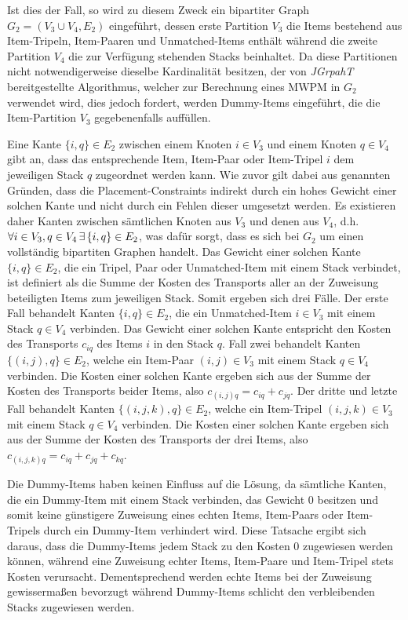 Ist dies der Fall, so wird zu diesem Zweck ein bipartiter Graph $G_2 = (V_3 \cup V_4, E_2)$ eingeführt,
dessen erste Partition $V_3$ die Items bestehend aus Item-Tripeln, Item-Paaren und Unmatched-Items enthält während die zweite Partition $V_4$
die zur Verfügung stehenden Stacks beinhaltet. Da diese Partitionen nicht notwendigerweise dieselbe Kardinalität besitzen, der von \textit{JGrpahT} bereitgestellte Algorithmus, welcher zur Berechnung eines \textsc{MWPM} in $G_2$ verwendet wird, dies jedoch fordert, werden Dummy-Items
eingeführt, die die Item-Partition $V_3$ gegebenenfalls auffüllen.


Eine Kante $\{i, q\} \in E_2$ zwischen einem Knoten $i \in V_3$ und einem Knoten $q \in V_4$ gibt an, dass das entsprechende Item, Item-Paar oder Item-Tripel $i$ dem jeweiligen Stack $q$ zugeordnet werden kann. Wie zuvor gilt dabei
aus genannten Gründen, dass die Placement-Constraints indirekt durch ein hohes Gewicht einer solchen Kante und nicht durch ein Fehlen dieser
umgesetzt werden. Es existieren daher Kanten zwischen sämtlichen Knoten aus $V_3$ und denen aus $V_4$, d.h. $\forall i \in V_3, q \in V_4
\thinspace \exists \thinspace \{i, q\} \in E_2$, was dafür sorgt, dass es sich bei $G_2$ um einen vollständig bipartiten Graphen handelt.
Das Gewicht einer solchen Kante $\{i, q\} \in E_2$, die ein Tripel, Paar oder Unmatched-Item mit einem Stack verbindet, ist definiert
als die Summe der Kosten des Transports aller an der Zuweisung beteiligten Items zum jeweiligen Stack. Somit ergeben sich drei Fälle.
Der erste Fall behandelt Kanten $\{i, q\} \in E_2$, die ein Unmatched-Item $i \in V_3$ mit einem Stack $q \in V_4$ verbinden.
Das Gewicht einer solchen Kante entspricht den Kosten des Transports $c_{iq}$ des Items $i$ in den Stack $q$.
Fall zwei behandelt Kanten $\{(i, j), q\} \in E_2$, welche ein Item-Paar $(i, j) \in V_3$ mit einem Stack $q \in V_4$
verbinden. Die Kosten einer solchen Kante ergeben sich aus der Summe der Kosten des Transports beider Items,
also $c_{(i, j)q} = c_{iq} + c_{jq}$.
Der dritte und letzte Fall behandelt Kanten $\{(i, j, k), q\} \in E_2$, welche ein Item-Tripel $(i, j, k) \in V_3$
mit einem Stack $q \in V_4$ verbinden. Die Kosten einer solchen Kante ergeben sich aus der Summe der Kosten des Transports
der drei Items, also $c_{(i, j, k)q} = c_{iq} + c_{jq} + c_{kq}$.

Die Dummy-Items haben keinen Einfluss auf die Lösung, da sämtliche Kanten, die ein Dummy-Item mit einem Stack verbinden,
das Gewicht $0$ besitzen und somit keine günstigere Zuweisung eines echten Items, Item-Paars oder Item-Tripels durch ein Dummy-Item
verhindert wird. Diese Tatsache ergibt sich daraus, dass die Dummy-Items jedem Stack zu den Kosten $0$ zugewiesen werden können,
während eine Zuweisung echter Items, Item-Paare und Item-Tripel stets Kosten verursacht. Dementsprechend werden echte Items bei der
Zuweisung gewissermaßen bevorzugt während Dummy-Items schlicht den verbleibenden Stacks zugewiesen werden.

